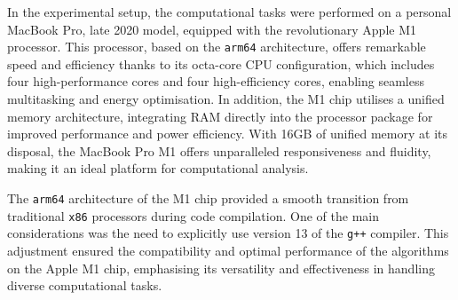 	In the experimental setup, the computational tasks were performed on a personal MacBook Pro, late 2020 model, equipped with the revolutionary Apple M1 processor. This processor, based on the \verb|arm64| architecture, offers remarkable speed and efficiency thanks to its octa-core CPU configuration, which includes four high-performance cores and four high-efficiency cores, enabling seamless multitasking and energy optimisation. In addition, the M1 chip utilises a unified memory architecture, integrating RAM directly into the processor package for improved performance and power efficiency. With 16GB of unified memory at its disposal, the MacBook Pro M1 offers unparalleled responsiveness and fluidity, making it an ideal platform for computational analysis.


	The \verb|arm64| architecture of the M1 chip provided a smooth transition from traditional \verb|x86| processors during code compilation. One of the main considerations was the need to explicitly use version 13 of the \verb|g++| compiler. This adjustment ensured the compatibility and optimal performance of the algorithms on the Apple M1 chip, emphasising its versatility and effectiveness in handling diverse computational tasks.
	